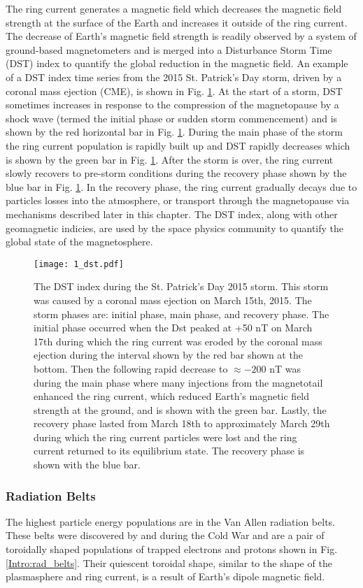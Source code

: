 The ring current generates a magnetic field which decreases the magnetic field strength at the surface of the Earth and increases it outside of the ring current. The decrease of Earth's magnetic field strength is readily observed by a system of ground-based magnetometers and is merged into a Disturbance Storm Time (DST) index to quantify the global reduction in the magnetic field. An example of a DST index time series from the 2015 St. Patrick's Day storm, driven by a coronal mass ejection (CME), is shown in Fig. \ref{Intro:dst}. At the start of a storm, DST sometimes increases in response to the compression of the magnetopause by a shock wave (termed the initial phase or sudden storm commencement) and is shown by the red horizontal bar in Fig. \ref{Intro:dst}. During the main phase of the storm the ring current population is rapidly built up and DST rapidly decreases which is shown by the green bar in Fig. \ref{Intro:dst}. After the storm is over, the ring current slowly recovers to pre-storm conditions during the recovery phase shown by the blue bar in Fig. \ref{Intro:dst}. In the recovery phase, the ring current gradually decays due to particles losses into the atmosphere, or transport through the magnetopause via mechanisms described later in this chapter. The DST index, along with other geomagnetic indicies, are used by the space physics community to quantify the global state of the magnetosphere.

\begin{figure}
\texttt{[image: 1\_dst.pdf]}
\caption{The DST index during the St. Patrick's Day 2015 storm. This storm was caused by a coronal mass ejection on March 15th, 2015. The storm phases are: initial phase, main phase, and recovery phase. The initial phase occurred when the Dst peaked at +50 nT on March 17th during which the ring current was eroded by the coronal mass ejection during the interval shown by the red bar shown at the bottom. Then the following rapid decrease to $\approx -200$ nT was during the main phase where many injections from the magnetotail enhanced the ring current, which reduced Earth's magnetic field strength at the ground, and is shown with the green bar. Lastly, the recovery phase lasted from March 18th to approximately March 29th during which the ring current particles were lost and the ring current returned to its equilibrium state. The recovery phase is shown with the blue bar.}
\label{Intro:dst}
\end{figure}

\subsubsection{Radiation Belts}\label{Intro:radiation_belt}
The highest particle energy populations are in the Van Allen radiation belts. These belts were discovered by \citet{Allen1959} and \citet{Vernov1960} during the Cold War and are a pair of toroidally shaped populations of trapped electrons and protons shown in Fig. \ref{Intro:rad_belts}. Their quiescent toroidal shape, similar to the shape of the plasmasphere and ring current, is a result of Earth's dipole magnetic field.

